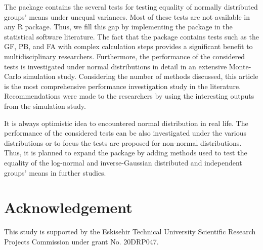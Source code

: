 The  package contains the several tests for testing equality of normally distributed groups' means under unequal variances. Most of these tests are not available in any R package. Thus, we fill this gap by implementing the package in the statistical software literature. The fact that the package contains tests such as the GF, PB, and FA with complex calculation steps provides a significant benefit to multidisciplinary researchers. Furthermore, the performance of the considered tests is investigated under normal distributions in detail in an extensive Monte-Carlo simulation study. Considering the number of methods discussed, this article is the most comprehensive performance investigation study in the literature. Recommendations were made to the researchers by using the interesting outputs from the simulation study.

It is always optimistic idea to encountered normal distribution in real life. The performance of the considered tests can be also investigated under the various distributions or to focus the tests are proposed for non-normal distributions. Thus, it is planned to expand the package by adding methods used to test the equality of the log-normal \citep{tian:2007} and inverse-Gaussian \citep{tian:2006, ma:2009} distributed and independent groups' means in further studies.


\section{Acknowledgement}

This study is supported by the Eskisehir Technical University Scientific Research Projects Commission under grant No. 20DRP047.



\address{Mustafa Cavus\\
  Eskisehir Technical University\\
  Department of Statistics\\
  Eskisehir, Turkey\\
  \url{https://orcid.org/0000-0002-6172-5449}\\
  }

\address{Berna Yazıcı\\
  Eskisehir Technical University\\
  Department of Statistics\\
  Eskisehir, Turkey\\
   \url{https://orcid.org/0000-0001-9843-7355}\\
  }

